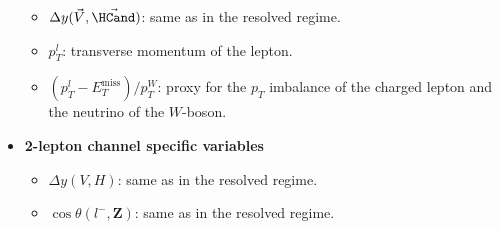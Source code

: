 \begin{itemize}
  \begin{itemize}
      \item $\Delta y(\vec{V},\vec{\HCand})$: same as in the resolved regime.
      \item $p_T^l$: transverse momentum of the lepton.
      \item $(p_T^{l} - E_T^{\textrm{miss}})/p_T^W$:  proxy for the $p_T$ imbalance of the charged lepton and the neutrino of the $W$-boson.
  \end{itemize}
  \item \textbf{2-lepton channel specific variables}
  \begin{itemize}
      \item $\Delta y(\textbf{$V$},\textbf{$H$})$: same as in the resolved regime.
      \item $\cos{\theta(\textbf{$l^-$},\textbf{Z})}$: same as in the resolved regime.
  \end{itemize}
\end{itemize}

\clearpage


